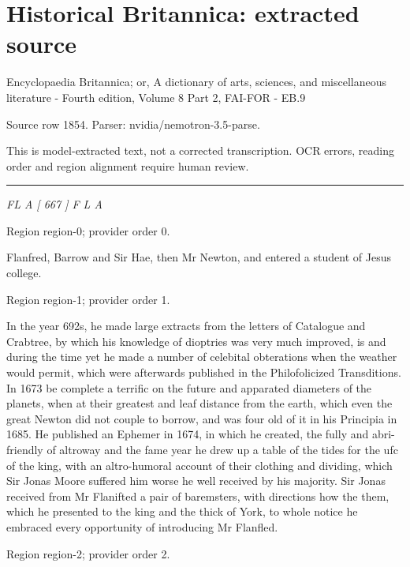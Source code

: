 \documentclass[11pt]{article}
\begin{document}
\section*{Historical Britannica: extracted source}
Encyclopaedia Britannica; or, A dictionary of arts, sciences, and miscellaneous literature - Fourth edition, Volume 8 Part 2, FAI-FOR - EB.9\par
{\small Source row 1854. Parser: nvidia/nemotron-3.5-parse.\par}
{\small This is model-extracted text, not a corrected transcription. OCR errors, reading order and region alignment require human review.\par}
\hrule\medskip
{\small\itshape FL A [ 667 ] F L A\par}

{\scriptsize\color{gray} Region region-0; provider order 0.\par}
\medskip

Flanfred, Barrow and Sir Hae, then Mr Newton, and entered a student of Jesus college.
\par

{\scriptsize\color{gray} Region region-1; provider order 1.\par}
\medskip

In the year 692s, he made large extracts from the letters of Catalogue and Crabtree, by which his knowledge of dioptries was very much improved, is and during the time yet he made a number of celebital obterations when the weather would permit, which were afterwards published in the Philofolicized Transditions. In 1673 be complete a terrific on the future and apparated diameters of the planets, when at their greatest and leaf distance from the earth, which even the great Newton did not couple to borrow, and was four old of it in his Principia in 1685. He published an Ephemer in 1674, in which he created, the fully and abri-friendly of altroway and the fame year he drew up a table of the tides for the ufc of the king, with an altro-humoral account of their clothing and dividing, which Sir Jonas Moore suffered him worse he well received by his majority. Sir Jonas received from Mr Flanifted a pair of baremsters, with directions how the them, which he presented to the king and the thick of York, to whole notice he embraced every opportunity of introducing Mr Flanfled.
\par

{\scriptsize\color{gray} Region region-2; provider order 2.\par}
\medskip
\end{document}
